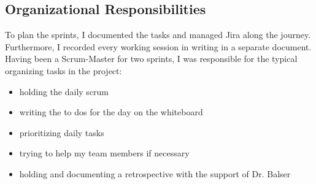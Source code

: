 \documentclass[12pt, a4paper]{article}
\begin{document}
\subsection{Organizational Responsibilities}
 To plan the sprints, I documented the tasks and managed Jira along the journey. Furthermore, I recorded every working session in writing in a separate document. Having been a Scrum-Master for two sprints, I was responsible for the typical organizing tasks in the project:
\begin{itemize}
\item holding the daily scrum
\item writing the to dos for the day on the whiteboard
\item prioritizing daily tasks
\item trying to help my team members if necessary
\item holding and documenting a retrospective with the support of Dr. Balser
\end{itemize}
\end{document}
